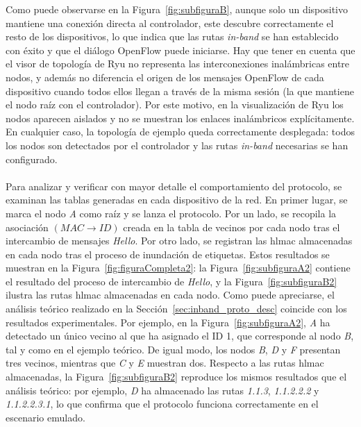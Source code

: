 Como puede observarse en la Figura~\ref{fig:subfiguraB}, aunque solo un dispositivo mantiene una conexión directa al controlador, este descubre correctamente el resto de los dispositivos, lo que indica que las rutas \textit{in-band} se han establecido con éxito y que el diálogo OpenFlow puede iniciarse. Hay que tener en cuenta que el visor de topología de Ryu no representa las interconexiones inalámbricas entre nodos, y además no diferencia el origen de los mensajes OpenFlow de cada dispositivo cuando todos ellos llegan a través de la misma sesión (la que mantiene el nodo raíz con el controlador). Por este motivo, en la visualización de Ryu los nodos aparecen aislados y no se muestran los enlaces inalámbricos explícitamente. En cualquier caso, la topología de ejemplo queda correctamente desplegada: todos los nodos son detectados por el controlador y las rutas \textit{in-band} necesarias se han configurado.\\
\\
Para analizar y verificar con mayor detalle el comportamiento del protocolo, se examinan las tablas generadas en cada dispositivo de la red. En primer lugar, se marca el nodo \textit{A} como raíz y se lanza el protocolo. Por un lado, se recopila la asociación \((MAC \rightarrow ID)\) creada en la tabla de vecinos por cada nodo tras el intercambio de mensajes \textit{Hello}. Por otro lado, se registran las \gls{hlmac} almacenadas en cada nodo tras el proceso de inundación de etiquetas. Estos resultados se muestran en la Figura~\ref{fig:figuraCompleta2}: la Figura~\ref{fig:subfiguraA2} contiene el resultado del proceso de intercambio de \textit{Hello}, y la Figura~\ref{fig:subfiguraB2} ilustra las rutas \gls{hlmac} almacenadas en cada nodo. Como puede apreciarse, el análisis teórico realizado en la Sección~\ref{sec:inband_proto_desc} coincide con los resultados experimentales. Por ejemplo, en la Figura~\ref{fig:subfiguraA2}, \textit{A} ha detectado un único vecino al que ha asignado el ID 1, que corresponde al nodo \textit{B}, tal y como en el ejemplo teórico. De igual modo, los nodos \textit{B}, \textit{D} y \textit{F} presentan tres vecinos, mientras que \textit{C} y \textit{E} muestran dos. Respecto a las rutas \gls{hlmac} almacenadas, la Figura~\ref{fig:subfiguraB2} reproduce los mismos resultados que el análisis teórico: por ejemplo, \textit{D} ha almacenado las rutas \textit{1.1.3}, \textit{1.1.2.2.2} y \textit{1.1.2.2.3.1}, lo que confirma que el protocolo funciona correctamente en el escenario emulado.

